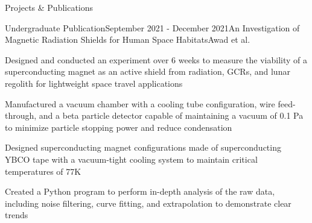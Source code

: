 \documentclass{resume} %
\begin{document}
\begin{rSection}{Projects \& Publications}

\begin{rSubsection}{Undergraduate Publication}{September 2021 - December 2021}{An Investigation of Magnetic Radiation Shields for Human Space Habitats}{Awad et al.}
\item Designed and conducted an experiment over 6 weeks to measure the viability of a superconducting magnet as an active shield from radiation, GCRs, and lunar regolith for lightweight space travel applications
\item Manufactured a vacuum chamber with a cooling tube configuration, wire feed-through, and a beta particle detector capable of maintaining a vacuum of 0.1 Pa to minimize particle stopping power and reduce condensation
\item Designed superconducting magnet configurations made of superconducting YBCO tape with a vacuum-tight cooling system to maintain critical temperatures of 77K
\item Created a Python program to perform in-depth analysis of the raw data, including noise filtering, curve fitting, and extrapolation to demonstrate clear trends

\end{rSubsection}

\begin{comment}
\begin{rSubsection}{Co-Founder, PolyTwist Designs}{November 2015 - Present}{\url{www.polytwist.xyz}}{}
\item Co-founded a small business designing and manufacturing original Rubik's-Cube-style puzzles with unique mechanisms, challenges, and solutions using FDM 3D Printing and SolidWorks
\item Designed and manufactured several novel products end-to-end resulting in 16+ original designs
\item Created and maintained a website and online shop resulting in \$20,000 in sales of 16+ products over three years
\item Negotiated a partnership with Rubik's Brand Ltd. to mass-produce a product, involving the design stages to manufacturing through injection molding and packaging design

\end{rSubsection}
\end{comment}

\end{rSection}
\end{document}
